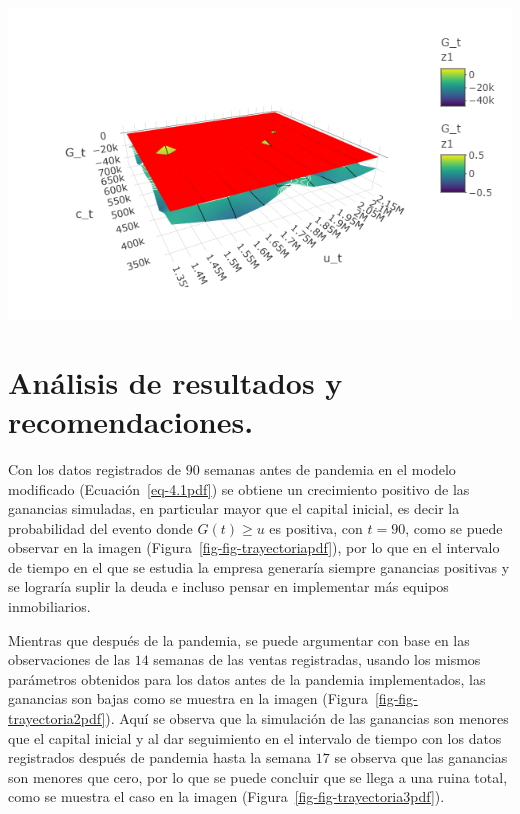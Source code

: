 \documentclass[
  us-letterpaper,
]{scrreprt}
\theoremstyle{plain}
\theoremstyle{plain}
\theoremstyle{definition}
\theoremstyle{remark}
\begin{document}
\begin{center}
\includegraphics[width=6.25in,height=\textheight]{fig-analisis3pdf.png}
\end{center}

\section{Análisis de resultados y
recomendaciones.}\label{anuxe1lisis-de-resultados-y-recomendaciones.}

Con los datos registrados de \(90\) semanas antes de pandemia en el
modelo modificado (Ecuación~\ref{eq-4.1pdf}) se obtiene un crecimiento
positivo de las ganancias simuladas, en particular mayor que el capital
inicial, es decir la probabilidad del evento donde \(G(t)\geq u\) es
positiva, con \(t=90\), como se puede observar en la imagen
(Figura~\ref{fig-fig-trayectoriapdf}), por lo que en el intervalo de
tiempo en el que se estudia la empresa generaría siempre ganancias
positivas y se lograría suplir la deuda e incluso pensar en implementar
más equipos inmobiliarios.

Mientras que después de la pandemia, se puede argumentar con base en las
observaciones de las \(14\) semanas de las ventas registradas, usando
los mismos parámetros obtenidos para los datos antes de la pandemia
implementados, las ganancias son bajas como se muestra en la imagen
(Figura~\ref{fig-fig-trayectoria2pdf}). Aquí se observa que la
simulación de las ganancias son menores que el capital inicial y al dar
seguimiento en el intervalo de tiempo con los datos registrados después
de pandemia hasta la semana \(17\) se observa que las ganancias son
menores que cero, por lo que se puede concluir que se llega a una ruina
total, como se muestra el caso en la imagen
(Figura~\ref{fig-fig-trayectoria3pdf}).
\end{document}
